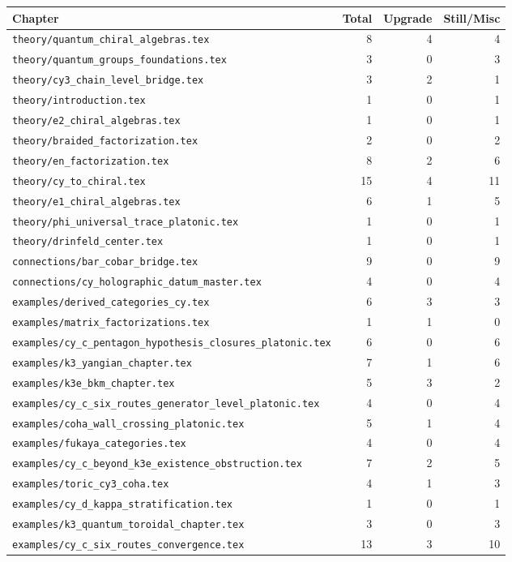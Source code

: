 \documentclass[11pt]{amsart}
\begin{document}
{{\begin{center}
\small
\begin{longtable}{@{}lrrr@{}}
\toprule
Chapter & Total & Upgrade & Still/Misc \\
\midrule\endhead
\texttt{theory/quantum\_chiral\_algebras.tex} & 8 & 4 & 4 \\
\texttt{theory/quantum\_groups\_foundations.tex} & 3 & 0 & 3 \\
\texttt{theory/cy3\_chain\_level\_bridge.tex} & 3 & 2 & 1 \\
\texttt{theory/introduction.tex} & 1 & 0 & 1 \\
\texttt{theory/e2\_chiral\_algebras.tex} & 1 & 0 & 1 \\
\texttt{theory/braided\_factorization.tex} & 2 & 0 & 2 \\
\texttt{theory/en\_factorization.tex} & 8 & 2 & 6 \\
\texttt{theory/cy\_to\_chiral.tex} & 15 & 4 & 11 \\
\texttt{theory/e1\_chiral\_algebras.tex} & 6 & 1 & 5 \\
\texttt{theory/phi\_universal\_trace\_platonic.tex} & 1 & 0 & 1 \\
\texttt{theory/drinfeld\_center.tex} & 1 & 0 & 1 \\
\texttt{connections/bar\_cobar\_bridge.tex} & 9 & 0 & 9 \\
\texttt{connections/cy\_holographic\_datum\_master.tex} & 4 & 0 & 4 \\
\texttt{examples/derived\_categories\_cy.tex} & 6 & 3 & 3 \\
\texttt{examples/matrix\_factorizations.tex} & 1 & 1 & 0 \\
\texttt{examples/cy\_c\_pentagon\_hypothesis\_closures\_platonic.tex} & 6 & 0 & 6 \\
\texttt{examples/k3\_yangian\_chapter.tex} & 7 & 1 & 6 \\
\texttt{examples/k3e\_bkm\_chapter.tex} & 5 & 3 & 2 \\
\texttt{examples/cy\_c\_six\_routes\_generator\_level\_platonic.tex} & 4 & 0 & 4 \\
\texttt{examples/coha\_wall\_crossing\_platonic.tex} & 5 & 1 & 4 \\
\texttt{examples/fukaya\_categories.tex} & 4 & 0 & 4 \\
\texttt{examples/cy\_c\_beyond\_k3e\_existence\_obstruction.tex} & 7 & 2 & 5 \\
\texttt{examples/toric\_cy3\_coha.tex} & 4 & 1 & 3 \\
\texttt{examples/cy\_d\_kappa\_stratification.tex} & 1 & 0 & 1 \\
\texttt{examples/k3\_quantum\_toroidal\_chapter.tex} & 3 & 0 & 3 \\
\texttt{examples/cy\_c\_six\_routes\_convergence.tex} & 13 & 3 & 10 \\
\bottomrule
\end{longtable}
\end{center}

}}
\end{document}
